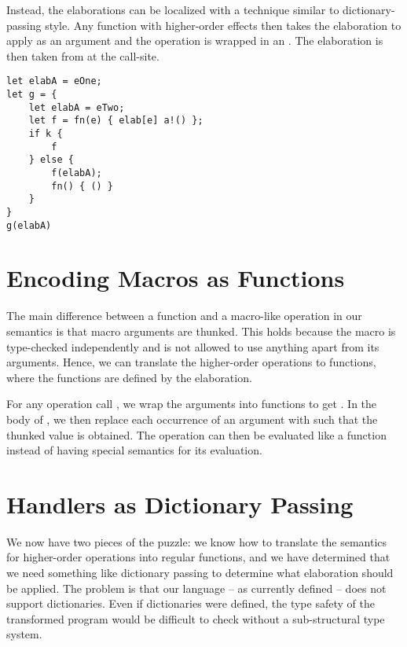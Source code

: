 Instead, the elaborations can be localized with a technique similar to dictionary-passing style. Any function with higher-order effects then takes the elaboration to apply as an argument and the operation is wrapped in an . The elaboration is then taken from  at the call-site.
\begin{lstlisting}[language=elaine,style=fancy]
let elabA = eOne;
let g = {
    let elabA = eTwo;
    let f = fn(e) { elab[e] a!() };
    if k {
        f
    } else {
        f(elabA);
        fn() { () }
    }
}
g(elabA)
\end{lstlisting}

\section{Encoding Macros as Functions}

The main difference between a function and a macro-like operation in our semantics is that macro arguments are thunked. This holds because the macro is type-checked independently and is not allowed to use anything apart from its arguments. Hence, we can translate the higher-order operations to functions, where the functions are defined by the elaboration.

For any operation call , we wrap the arguments into functions to get . In the body of , we then replace each occurrence of an argument  with  such that the thunked value is obtained. The  operation can then be evaluated like a function instead of having special semantics for its evaluation.

\section{Handlers as Dictionary Passing}

We now have two pieces of the puzzle: we know how to translate the semantics for higher-order operations into regular functions, and we have determined that we need something like dictionary passing to determine what elaboration should be applied. The problem is that our language -- as currently defined -- does not support dictionaries. Even if dictionaries were defined, the type safety of the transformed program would be difficult to check without a sub-structural type system.

